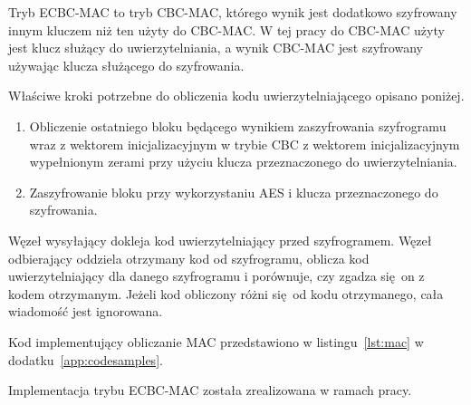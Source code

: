 Tryb ECBC-MAC to tryb CBC-MAC, którego wynik jest dodatkowo szyfrowany innym kluczem niż ten użyty do CBC-MAC. W tej pracy do CBC-MAC użyty jest klucz służący do uwierzytelniania, a wynik CBC-MAC jest szyfrowany używając klucza służącego do szyfrowania.

Właściwe kroki potrzebne do obliczenia kodu uwierzytelniającego opisano poniżej.

\begin{enumerate}
\item Obliczenie ostatniego bloku będącego wynikiem zaszyfrowania szyfrogramu wraz z wektorem inicjalizacyjnym w trybie CBC z wektorem inicjalizacyjnym wypełnionym zerami przy użyciu klucza przeznaczonego do uwierzytelniania.
\item Zaszyfrowanie bloku przy wykorzystaniu AES i klucza przeznaczonego do szyfrowania.
\end{enumerate}

Węzeł wysyłający dokleja kod uwierzytelniający przed szyfrogramem. Węzeł odbierający oddziela otrzymany kod od szyfrogramu, oblicza kod uwierzytelniający dla danego szyfrogramu i porównuje, czy zgadza się on z kodem otrzymanym. Jeżeli kod obliczony różni się od kodu otrzymanego, cała wiadomość jest ignorowana.

Kod implementujący obliczanie MAC przedstawiono w listingu~\ref{lst:mac} w dodatku~\ref{app:codesamples}.

Implementacja trybu ECBC-MAC została zrealizowana w ramach pracy.
